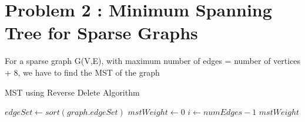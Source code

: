 \documentclass[12pt,letterpaper]{article}
\begin{document}
\section*{Problem 2 : Minimum Spanning Tree for Sparse Graphs}
For a sparse graph G(V,E), with maximum number of edges = number of vertices + 8, we have to find the MST of the graph \hfill \break
\begin{algorithm}
    \caption{MST using Reverse Delete Algorithm}\label{euclid}
    \begin{algorithmic}[1]
    
    \State $edgeSet \gets sort(graph.edgeSet) $
    \State $mstWeight \gets 0$
    \State $i \gets numEdges-1$
    \Return $mstWeight$
    \EndProcedure
    \end{algorithmic}
\end{algorithm}
\end{document}
